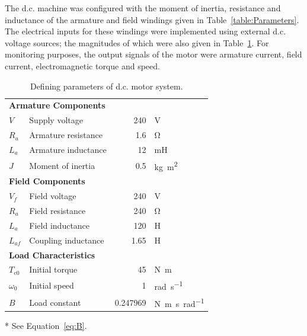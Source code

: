 \documentclass[a4paper,11pt,twocolumn]{article}
\newcommand{\V}{\si{\volt}\xspace}
\newcommand{\Ohm}{\si{\ohm}\xspace}
\renewcommand{\H}{\si{\henry}\xspace}
\newcommand{\mH}{\si{\milli\henry}\xspace}
\newcommand{\Nm}{\si{\newton\metre}\xspace}
\newcommand{\rps}{\si{\radian\per\second}\xspace}
\newcommand{\kgmm}{\si{\kilogram\square\metre}\xspace}
\newcommand{\Nmspr}{\si{\newton\metre\second\per\radian}\xspace}
\newcommand{\DC}{d.c.\xspace}
\begin{document}
The \DC machine was configured with the moment of inertia, resistance and 
inductance of the armature and field windings given in 
Table~\vref{table:Parameters}. The electrical inputs for these windings were 
implemented using external \DC voltage sources; the magnitudes of which were 
also given in Table~\ref{table:Parameters}. For monitoring purposes, the output 
signals of the motor were armature current, field current, electromagnetic 
torque and speed.
\begin{table}[h]
    \centering
    \footnotesize
    \begin{threeparttable}
        \caption{Defining parameters of \DC motor system.\vspace{-\parsep}}
        \label{table:Parameters}
        \begin{tabular}{@{}llrl@{}}
            \toprule
            \multicolumn{4}{l}{\textbf{Armature Components}} \\
            \hspace{1em}$V$   & Supply voltage      & 240 & \V \\
            \hspace{1em}$R_a$ & Armature resistance & 1.6 & \Ohm \\
            \hspace{1em}$L_a$ & Armature inductance &  12 & \mH \\
            \hspace{1em}$J$   & Moment of inertia   & 0.5 & \kgmm \\
            \midrule
            \multicolumn{4}{l}{\textbf{Field Components}} \\
            \hspace{1em}$V_f$    & Field voltage       &  240 & \V \\
            \hspace{1em}$R_a$    & Field resistance    &  240 & \Ohm \\
            \hspace{1em}$L_a$    & Field inductance    &  120 & \H \\
            \hspace{1em}$L_{af}$ & Coupling inductance & 1.65 & \H \\
            \midrule
            \multicolumn{4}{l}{\textbf{Load Characteristics}} \\
            \hspace{1em}$T_{e0}$   & Initial torque         & 45       & \Nm \\
            \hspace{1em}$\omega_0$ & Initial speed          &  1       & \rps \\
            \hspace{1em}$B$        & Load constant\tnote{*} & 0.247969 & \Nmspr 
            \\
            \bottomrule
        \end{tabular}
        \begin{tablenotes}
            \item[*]See Equation~\vref{eq:B}.
        \end{tablenotes}
    \end{threeparttable}
\end{table}
\end{document}
